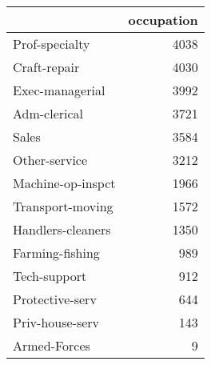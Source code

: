 \begin{tabular}{lr}
\toprule
{} &  occupation \\
\midrule
 Prof-specialty    &        4038 \\
 Craft-repair      &        4030 \\
 Exec-managerial   &        3992 \\
 Adm-clerical      &        3721 \\
 Sales             &        3584 \\
 Other-service     &        3212 \\
 Machine-op-inspct &        1966 \\
 Transport-moving  &        1572 \\
 Handlers-cleaners &        1350 \\
 Farming-fishing   &         989 \\
 Tech-support      &         912 \\
 Protective-serv   &         644 \\
 Priv-house-serv   &         143 \\
 Armed-Forces      &           9 \\
\bottomrule
\end{tabular}

